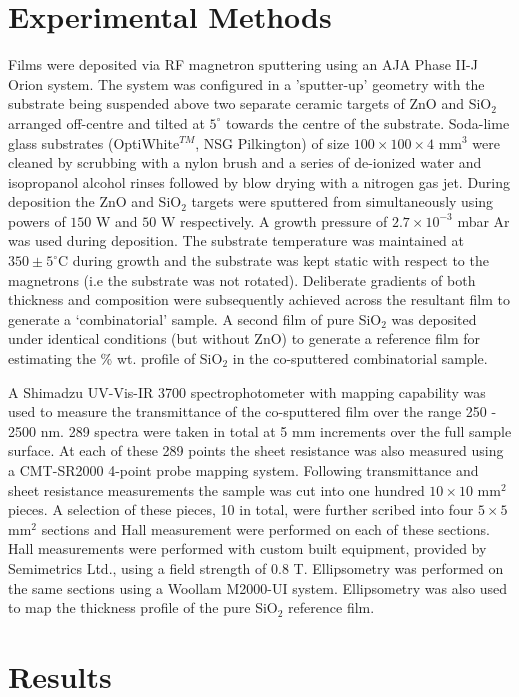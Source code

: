 \documentclass[preprint]{elsarticle}
\begin{document}
\section{Experimental Methods}

Films were deposited via RF magnetron sputtering using an AJA Phase II-J Orion system. The system was configured in a 'sputter-up' geometry with the substrate being suspended above two separate ceramic targets of ZnO and SiO$_2$ arranged off-centre and tilted at $5^{\circ}$ towards the centre of the substrate.  Soda-lime glass substrates (OptiWhite$^{TM}$, NSG Pilkington) of size $100\times100\times4$ mm$^{3}$ were cleaned by scrubbing with a nylon brush and a series of de-ionized water and isopropanol alcohol rinses followed by blow drying with a nitrogen gas jet. During deposition the ZnO and SiO$_2$ targets were sputtered from simultaneously using powers of $150$ W and $50$ W respectively. A growth pressure of $2.7\times10^{-3}$ mbar Ar was used during deposition. The substrate temperature was maintained at $350\pm5^{\circ}$C during growth and the substrate was kept static with respect to the magnetrons (i.e the substrate was not rotated). Deliberate gradients of both thickness and composition were subsequently achieved across the resultant film to generate a `combinatorial' sample. A second film of pure SiO$_{2}$ was deposited under identical conditions (but without ZnO) to generate a reference film for estimating the \% wt. profile of SiO$_{2}$ in the co-sputtered combinatorial sample.

A Shimadzu UV-Vis-IR 3700 spectrophotometer with mapping capability was used to measure the transmittance of the co-sputtered film over the range 250 - 2500 nm. 289 spectra were taken in total at 5 mm increments over the full sample surface. At each of these 289 points the sheet resistance was also measured using a CMT-SR2000 4-point probe mapping system. Following transmittance and sheet resistance measurements the sample was cut into one hundred $10\times10$ mm$^2$ pieces. A selection of these pieces, 10 in total, were further scribed into four $5\times5$ mm$^2$ sections and Hall measurement were performed on each of these sections. Hall measurements were performed with custom built equipment, provided by Semimetrics Ltd., using a field strength of 0.8 T.  Ellipsometry was performed on the same sections using a Woollam M2000-UI system. Ellipsometry was also used to map the thickness profile of the pure SiO$_{2}$ reference film.

\section{Results}\label{sec:2}
\end{document}
